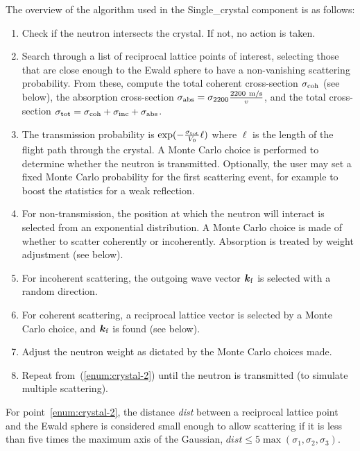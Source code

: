 The overview of the algorithm used in the Single\_crystal component is
as follows:
\begin{enumerate}
\item\label{enum:crystal-1} Check if the neutron intersects the
  crystal. If not, no action is taken.
\item\label{enum:crystal-2} Search through a list of reciprocal lattice
  points of interest, selecting those that are close enough to the Ewald
  sphere to have a non-vanishing scattering probability. From these,
  compute the total coherent cross-section $\sigma_{\rm coh}$ (see
  below), the absorption cross-section $\sigma_{\rm abs} = \sigma_{\rm
  2200} \frac{{\rm 2200~m/s}}{v}$, and the total cross-section
  $\sigma_{\rm tot} = \sigma_{\rm coh}+\sigma_{\rm inc}+\sigma_{\rm abs}$.
\item\label{enum:crystal-3} The transmission probability is
  $\exp(- \frac{\sigma_{\rm tot}}{V_0}\ell)$ where $\ell$ is the length of
  the flight path through the crystal. A Monte Carlo choice is
  performed to determine
  whether the neutron is transmitted. Optionally, the user may
  set a fixed Monte Carlo probability for the first scattering event,
  for example to boost the statistics for a weak reflection.
\item\label{enum:crystal-4} For non-transmission, the position at which
  the neutron will interact is selected from an exponential
  distribution. A Monte Carlo choice is made of whether to scatter
  coherently or incoherently. Absorption is treated by weight adjustment
  (see below).
\item\label{enum:crystal-5} For incoherent scattering, the outgoing wave
  vector $\boldsymbol{k}_{\rm f}$ is selected with a random direction.
\item\label{enum:crystal-6} For coherent scattering, a reciprocal
  lattice vector is selected by a Monte Carlo choice, and
  $\boldsymbol{k}_{\rm f}$ is found (see below).
\item\label{enum:crystal-7} Adjust the neutron weight as dictated by the
  Monte Carlo choices made.
\item\label{enum:crystal-8} Repeat from~(\ref{enum:crystal-2}) until the
  neutron is transmitted (to simulate multiple scattering).
\end{enumerate}

For point~\ref{enum:crystal-2}, the distance
\textit{dist} between a reciprocal lattice point and the Ewald sphere is
considered small enough to allow scattering if it is less than five
times the maximum axis of the Gaussian, $\textit{dist} \leq
5\max(\sigma_1,\sigma_2,\sigma_3)$.

